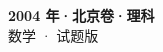 \documentclass[zihao=-4, a4paper]{ctexart}
\begin{document}
\begin{center}
  {\Large\bfseries 2004 年·北京卷·理科}\\[4pt]
  {\large 数学 · 试题版}
\end{center}
\medskip
{}

\end{document}
